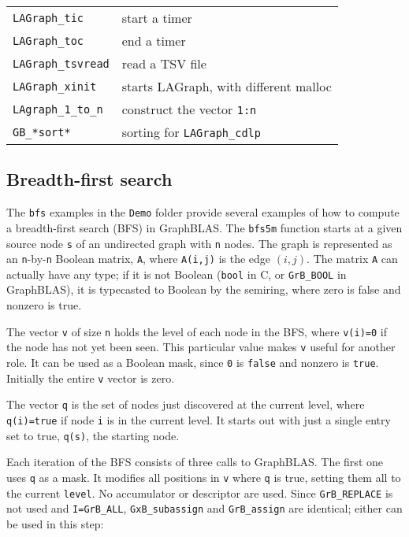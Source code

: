 \documentclass[12pt]{article}
\begin{document}
{\begin{tabular}{ll}
\verb'LAGraph_tic'              & start a timer \\
\verb'LAGraph_toc'              & end a timer \\
\verb'LAGraph_tsvread'          & read a TSV file \\
\verb'LAGraph_xinit'            & starts LAGraph, with different malloc \\
\verb'LAgraph_1_to_n'           & construct the vector \verb'1:n' \\
\verb'GB_*sort*'                & sorting for \verb'LAGraph_cdlp' \\
\end{tabular}}


\newpage
\subsection{Breadth-first search}
\label{bfs}

The \verb'bfs' examples in the \verb'Demo' folder provide several examples of
how to compute a breadth-first search (BFS) in GraphBLAS.  The \verb'bfs5m'
function starts at a given source node \verb's' of an undirected graph with
\verb'n' nodes.  The graph is represented as an \verb'n'-by-\verb'n'
Boolean matrix, \verb'A', where \verb'A(i,j)' is the edge $(i,j)$.  The matrix
\verb'A' can actually have any type; if it is not Boolean (\verb'bool' in C, or
\verb'GrB_BOOL' in GraphBLAS), it is typecasted to Boolean by the semiring,
where zero is false and nonzero is true.

The vector \verb'v' of size \verb'n' holds the level of each node in the
BFS, where \verb'v(i)=0' if the node has not yet been seen.  This particular
value makes \verb'v' useful for another role.  It can be used as a Boolean
mask, since \verb'0' is \verb'false' and nonzero is \verb'true'.
Initially the entire \verb'v' vector is zero.

The vector \verb'q' is the set of nodes just discovered at the current level,
where \verb'q(i)=true' if node \verb'i' is in the current level.  It starts out
with just a single entry set to true, \verb'q(s)', the starting node.

Each iteration of the BFS consists of three calls to GraphBLAS.  The first one
uses \verb'q' as a mask.  It modifies all positions in \verb'v' where \verb'q'
is true, setting them all to the current \verb'level'.  No accumulator or
descriptor are used.  Since \verb'GrB_REPLACE' is not used and
\verb'I=GrB_ALL', \verb'GxB_subassign' and \verb'GrB_assign' are identical;
either can be used in this step:
\end{document}
